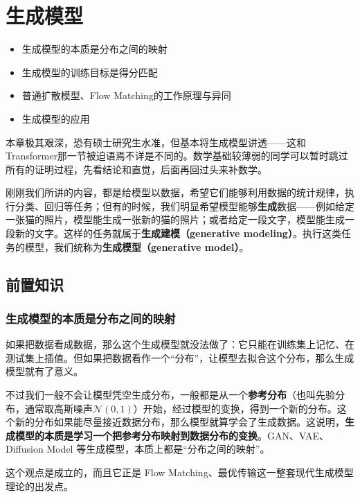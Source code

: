 \chapter{生成模型}

\begin{intro}
    \begin{itemize}
        \item 生成模型的本质是分布之间的映射
        \item 生成模型的训练目标是得分匹配
        \item 普通扩散模型、Flow Matching的工作原理与异同
        \item 生成模型的应用
    \end{itemize}
    本章极其艰深，恐有硕士研究生水准，但基本将生成模型讲透——这和Transformer那一节被迫语焉不详是不同的。数学基础较薄弱的同学可以暂时跳过所有的证明过程，先看结论和直觉，后面再回过头来补数学。
\end{intro}

刚刚我们所讲的内容，都是给模型以数据，希望它们能够利用数据的统计规律，执行分类、回归等任务；但有的时候，我们明显希望模型能够\textbf{生成}数据——例如给定一张猫的照片，模型能生成一张新的猫的照片；或者给定一段文字，模型能生成一段新的文字。这样的任务就属于\textbf{生成建模（generative modeling）}。执行这类任务的模型，我们统称为\textbf{生成模型（generative model）}。

\section{前置知识}

\subsection{生成模型的本质是分布之间的映射}

如果把数据看成数据，那么这个生成模型就没法做了：它只能在训练集上记忆、在测试集上插值。但如果把数据看作一个“分布”，让模型去拟合这个分布，那么生成模型就有了意义。

不过我们一般不会让模型凭空生成分布，一般都是从一个\textbf{参考分布}（也叫先验分布，通常取高斯噪声$\mathcal{N}(0,1)$）开始，经过模型的变换，得到一个新的分布。这个新的分布如果能尽量接近数据分布，那么模型就算学会了生成数据。这说明，\textbf{生成模型的本质是学习一个把参考分布映射到数据分布的变换}。GAN、VAE、Diffusion Model 等生成模型，本质上都是“分布之间的映射”。

这个观点是成立的，而且它正是 Flow Matching、最优传输这一整套现代生成模型理论的出发点。

